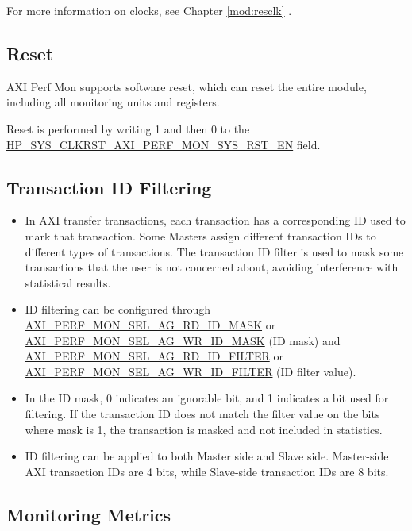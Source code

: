 \documentclass[main\_\_EN.tex]{subfiles}
\begin{document}
For more information on clocks, see Chapter \ref{mod:resclk} \textit{}.


\subsection{Reset}

AXI Perf Mon supports software reset, which can reset the entire module, including all monitoring units and registers.

Reset is performed by writing 1 and then 0 to the \hyperref[fielddesc:HPSYSCLKRSTAXIPERFMONSYSRSTEN]{HP\_SYS\_CLKRST\_AXI\_PERF\_MON\_SYS\_RST\_EN} field.

\subsection{Transaction ID Filtering}
\begin{itemize}
    \item In AXI transfer transactions, each transaction has a corresponding ID used to mark that transaction. Some Masters assign different transaction IDs to different types of transactions. The transaction ID filter is used to mask some transactions that the user is not concerned about, avoiding interference with statistical results.
    \item ID filtering can be configured through \hyperref[fielddesc:AXIPERFMONSELAGNRDIDMASK]{AXI\_PERF\_MON\_SEL\_AG\_RD\_ID\_MASK} or \hyperref[fielddesc:AXIPERFMONSELAGNWRIDMASK]{AXI\_PERF\_MON\_SEL\_AG\_WR\_ID\_MASK} (ID mask) and \hyperref[fielddesc:AXIPERFMONSELAGNRDIDFILTER]{AXI\_PERF\_MON\_SEL\_AG\_RD\_ID\_FILTER} or \hyperref[fielddesc:AXIPERFMONSELAGNWRIDFILTER]{AXI\_PERF\_MON\_SEL\_AG\_WR\_ID\_FILTER} (ID filter value).
    \item In the ID mask, 0 indicates an ignorable bit, and 1 indicates a bit used for filtering. If the transaction ID does not match the filter value on the bits where mask is 1, the transaction is masked and not included in statistics.
    \item ID filtering can be applied to both Master side and Slave side. Master-side AXI transaction IDs are 4 bits, while Slave-side transaction IDs are 8 bits.
\end{itemize}

\subsection{Monitoring Metrics}
\end{document}

